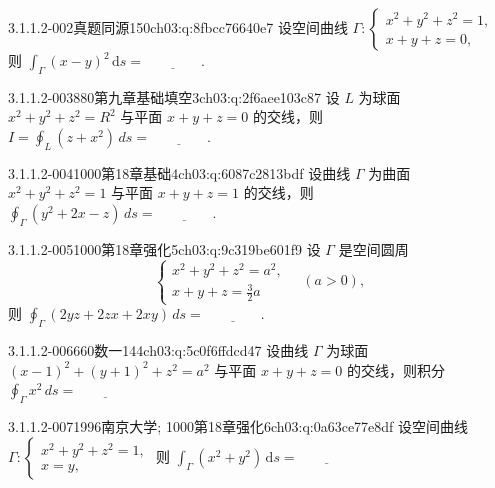 \begin{q}{3.1.1.2-002}{真题同源150}{ch03:q:8fbcc76640e7}
设空间曲线 $\Gamma:\begin{cases} x^2+y^2+z^2=1,\\ x+y+z=0, \end{cases}$ 则 $\displaystyle \int_{\Gamma}(x-y)^2\,\mathrm{d}s=\underline{\hspace{4em}}.$
\end{q}

\begin{q}{3.1.1.2-003}{880第九章基础填空3}{ch03:q:2f6aee103c87}
设 $L$ 为球面 $x^2+y^2+z^2=R^2$ 与平面 $x+y+z=0$ 的交线，则 $\displaystyle I=\oint_L (z+x^2)\,ds=\underline{\hspace{4em}}.$
\end{q}

\begin{q}{3.1.1.2-004}{1000第18章基础4}{ch03:q:6087c2813bdf}
设曲线 $\Gamma$ 为曲面 $x^2+y^2+z^2=1$ 与平面 $x+y+z=1$ 的交线，则 $\displaystyle \oint_{\Gamma}(y^2+2x-z)\,ds=\underline{\hspace{4em}}$.
\end{q}

\begin{q}{3.1.1.2-005}{1000第18章强化5}{ch03:q:9c319be601f9}
设 $\Gamma$ 是空间圆周
\[
\begin{cases}
x^2+y^2+z^2=a^2,\\
x+y+z=\frac{3}{2}a
\end{cases}
\quad (a>0),
\]
则
$\displaystyle \oint_{\Gamma} (2yz+2zx+2xy)\,ds=\underline{\hspace{4em}}.$
\end{q}

\begin{q}{3.1.1.2-006}{660数一144}{ch03:q:5c0f6ffdcd47}
设曲线 $\Gamma$ 为球面 $(x-1)^2+(y+1)^2+z^2=a^2$ 与平面 $x+y+z=0$ 的交线，则积分 $\displaystyle \oint_{\Gamma} x^2\,ds=\underline{\hspace{4em}}$
\end{q}

\begin{q}{3.1.1.2-007}{1996南京大学; 1000第18章强化6}{ch03:q:0a63ce77e8df}
设空间曲线 $\Gamma:\begin{cases} x^2+y^2+z^2=1,\\ x=y, \end{cases}$ 则 $\displaystyle \int_{\Gamma} (x^2+y^2)\,\mathrm{d}s = \underline{\hspace{4em}}$
\end{q}


